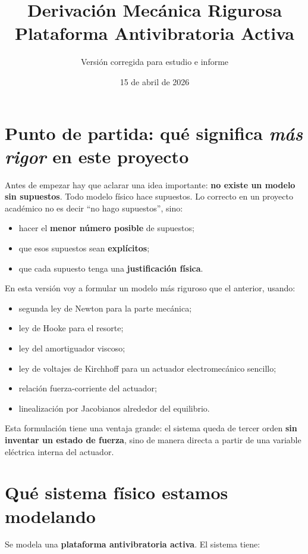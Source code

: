 \documentclass[11pt]{article}
\title{Derivaci\'on Mec\'anica Rigurosa\\Plataforma Antivibratoria Activa}
\author{Versi\'on corregida para estudio e informe}
\date{15 de abril de 2026}
\begin{document}
\maketitle
\tableofcontents
\newpage

\section{Punto de partida: qu\'e significa \textit{m\'as rigor} en este proyecto}

Antes de empezar hay que aclarar una idea importante: \textbf{no existe un modelo sin supuestos}. Todo modelo f\'isico hace supuestos. Lo correcto en un proyecto acad\'emico no es decir ``no hago supuestos'', sino:

\begin{itemize}[leftmargin=1.2cm]
\item hacer el \textbf{menor n\'umero posible} de supuestos;
\item que esos supuestos sean \textbf{expl\'icitos};
\item que cada supuesto tenga una \textbf{justificaci\'on f\'isica}.
\end{itemize}

En esta versi\'on voy a formular un modelo m\'as riguroso que el anterior, usando:

\begin{itemize}[leftmargin=1.2cm]
\item segunda ley de Newton para la parte mec\'anica;
\item ley de Hooke para el resorte;
\item ley del amortiguador viscoso;
\item ley de voltajes de Kirchhoff para un actuador electromec\'anico sencillo;
\item relaci\'on fuerza-corriente del actuador;
\item linealizaci\'on por Jacobianos alrededor del equilibrio.
\end{itemize}

Esta formulaci\'on tiene una ventaja grande: el sistema queda de tercer orden \textbf{sin inventar un estado de fuerza}, sino de manera directa a partir de una variable el\'ectrica interna del actuador.

\section{Qu\'e sistema f\'isico estamos modelando}

Se modela una \textbf{plataforma antivibratoria activa}. El sistema tiene:
\end{document}
